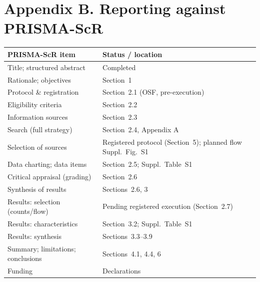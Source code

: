 \documentclass[3p,times]{elsarticle}
\begin{document}
\section*{Appendix B. Reporting against PRISMA-ScR}
\begin{table}[h]
\centering
\footnotesize
\begin{tabular}{@{}L{0.46\columnwidth}L{0.44\columnwidth}@{}}
\toprule
PRISMA-ScR item & Status / location \\
\midrule
Title; structured abstract & Completed \\
Rationale; objectives & Section~1 \\
Protocol \& registration & Section~2.1 (OSF, pre-execution) \\
Eligibility criteria & Section~2.2 \\
Information sources & Section~2.3 \\
Search (full strategy) & Section~2.4, Appendix A \\
Selection of sources & Registered protocol (Section~5); planned flow Suppl.\ Fig.~S1 \\
Data charting; data items & Section~2.5; Suppl.\ Table~S1 \\
Critical appraisal (grading) & Section~2.6 \\
Synthesis of results & Sections~2.6, 3 \\
Results: selection (counts/flow) & Pending registered execution (Section~2.7) \\
Results: characteristics & Section~3.2; Suppl.\ Table~S1 \\
Results: synthesis & Sections~3.3--3.9 \\
Summary; limitations; conclusions & Sections~4.1, 4.4, 6 \\
Funding & Declarations \\
\bottomrule
\end{tabular}
\end{table}
\end{document}
